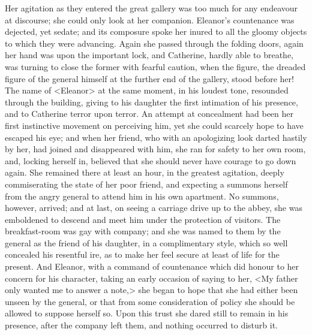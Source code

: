  Her agitation as they entered the great gallery was too much for any endeavour at discourse; she could only look at her companion. Eleanor's countenance was dejected, yet sedate; and its composure spoke her inured to all the gloomy objects to which they were advancing. Again she passed through the folding doors, again her hand was upon the important lock, and Catherine, hardly able to breathe, was turning to close the former with fearful caution, when the figure, the dreaded figure of the general himself at the further end of the gallery, stood before her! The name of <Eleanor> at the same moment, in his loudest tone, resounded through the building, giving to his daughter the first intimation of his presence, and to Catherine terror upon terror. An attempt at concealment had been her first instinctive movement on perceiving him, yet she could scarcely hope to have escaped his eye; and when her friend, who with an apologizing look darted hastily by her, had joined and disappeared with him, she ran for safety to her own room, and, locking herself in, believed that she should never have courage to go down again. She remained there at least an hour, in the greatest agitation, deeply commiserating the state of her poor friend, and expecting a summons herself from the angry general to attend him in his own apartment. No summons, however, arrived; and at last, on seeing a carriage drive up to the abbey, she was emboldened to descend and meet him under the protection of visitors. The breakfast-room was gay with company; and she was named to them by the general as the friend of his daughter, in a complimentary style, which so well concealed his resentful ire, as to make her feel secure at least of life for the present. And Eleanor, with a command of countenance which did honour to her concern for his character, taking an early occasion of saying to her, <My father only wanted me to answer a note,> she began to hope that she had either been unseen by the general, or that from some consideration of policy she should be allowed to suppose herself so. Upon this trust she dared still to remain in his presence, after the company left them, and nothing occurred to disturb it. 

